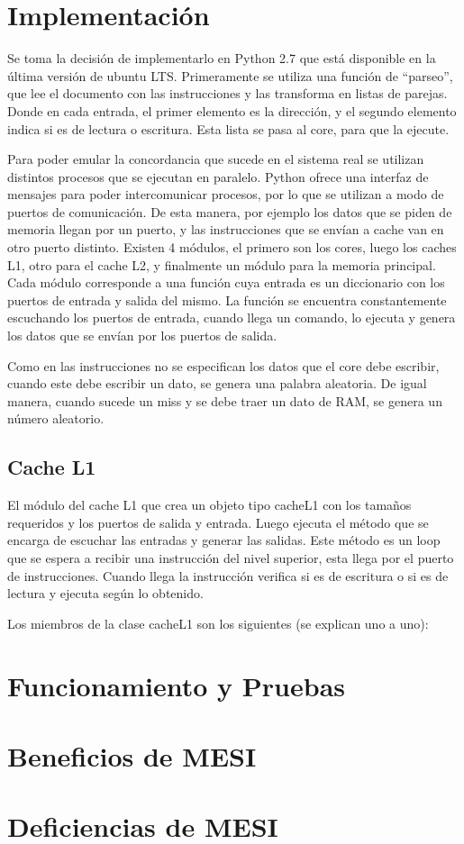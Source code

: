 \documentclass {article}
\begin{document}
\section{Implementación}
Se toma la decisión de implementarlo en Python 2.7 que está disponible en la última versión de
ubuntu LTS. Primeramente se utiliza una función de ``parseo'', que lee el documento con las instrucciones
y las transforma en listas de parejas. Donde en cada entrada, el primer elemento es la dirección, y
el segundo elemento indica si es de lectura o escritura. Esta lista se pasa al core, para que la
ejecute.

Para poder emular la concordancia que sucede en el sistema real se utilizan distintos procesos que se
ejecutan en paralelo. Python ofrece una interfaz de mensajes para poder intercomunicar procesos, por
lo que se utilizan a modo de puertos de comunicación. De esta manera, por ejemplo los datos que se
piden de memoria llegan por un puerto, y las instrucciones que se envían a cache van en otro puerto
distinto. Existen 4 módulos, el primero son los cores, luego los caches L1, otro para el cache L2, y
finalmente un módulo para la memoria principal. Cada módulo corresponde a una función cuya entrada
es un diccionario con los puertos de entrada y salida del mismo. La función se encuentra
constantemente escuchando los puertos de entrada, cuando llega un comando, lo ejecuta y genera los
datos que se envían por los puertos de salida. 

Como en las instrucciones no se especifican los datos que el core debe escribir, cuando este debe
escribir un dato, se genera una palabra aleatoria. De igual manera, cuando sucede un miss y se debe
traer un dato de RAM, se genera un número aleatorio.

\subsection{Cache L1}
El módulo del cache L1 que crea un objeto tipo cacheL1 con los tamaños requeridos y los puertos de
salida y entrada. Luego ejecuta el método que se encarga de escuchar las entradas y generar las
salidas. Este método es un loop que se espera a recibir una instrucción del nivel superior, esta
llega por el puerto de instrucciones. Cuando llega la instrucción verifica si es de escritura o si
es de lectura y ejecuta según lo obtenido.

Los miembros de la clase cacheL1 son los siguientes (se explican uno a uno):
\section{Funcionamiento y Pruebas}

\section{Beneficios de MESI}

\section{Deficiencias de MESI}
\end{document}
